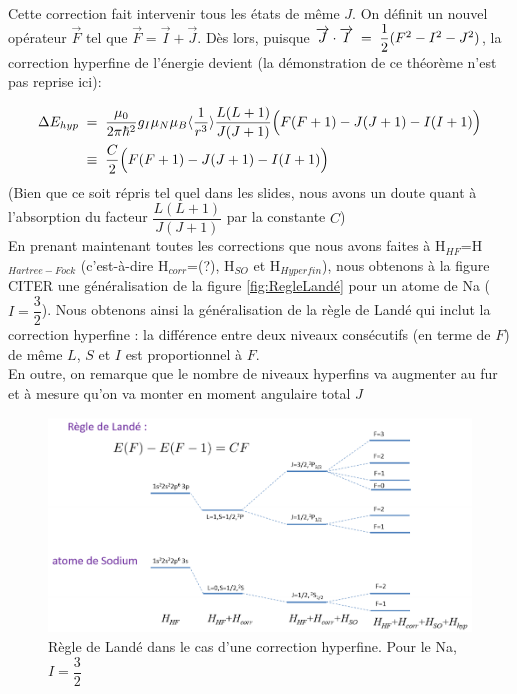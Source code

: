 Cette correction fait intervenir tous les états de même $J$. On définit un nouvel opérateur $\vec{F}$ tel que $\vec{F} = \vec{I} + \vec{J}$. Dès lors, puisque $\overrightarrow{J}\cdot\overrightarrow{I} \; = \;  \dfrac{1}{2}(F^2-I^2-J^2)$, la correction hyperfine  de l'énergie devient (la démonstration de ce théorème n'est pas reprise ici):

\begin{align*}
    \Delta E_{hyp} &\; = \;  \dfrac{\mu_0}{2\pi\hbar^2}g_I\mu_N\mu_B\langle\dfrac{1}{r^3}\rangle\dfrac{L(L+1)}{J(J+1)}\Big( F(F+1) - J(J+1) - I(I+1) \Big)\\
    &\;\equiv\;
    \dfrac{C}{2} \Big( F(F+1) - J(J+1) - I(I+1) \Big)
\end{align*}
(Bien que ce soit répris tel quel dans les slides, nous avons un doute quant à l'absorption du facteur $\dfrac{L(L+1)}{J(J+1)}$ par la constante $C$)\\

En prenant maintenant toutes les corrections que nous avons faites à H$_{HF}$=H$_{Hartree-Fock}$ (c'est-à-dire H$_{corr}$=(?), H$_{SO}$ et H$_{Hyperfin}$), nous obtenons à la figure CITER une généralisation de la figure \ref{fig:RegleLandé} pour un atome de Na ($I=\dfrac{3}{2}$). Nous obtenons ainsi la généralisation de la règle de Landé qui inclut la correction hyperfine : la différence entre deux niveaux consécutifs (en terme de $F$) de même $L$, $S$ et $I$ est proportionnel à $F$.\\
En outre, on remarque que le nombre de niveaux hyperfins va augmenter au fur et à mesure qu'on va monter en moment angulaire total $J$
\begin{figure}[tph]
    \centering
    \includegraphics[scale=0.8]{Images2/règle_Landé2.png}
    \caption{Règle de Landé dans le cas d'une correction hyperfine. Pour le Na, $I=\dfrac{3}{2}$}
    \label{fig:règle_landé2}
\end{figure}

